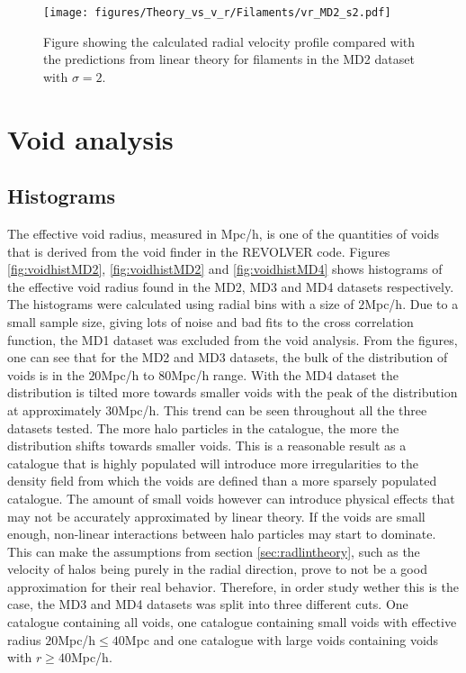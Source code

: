 \begin{figure}[H]
    \texttt{[image: figures/Theory\_vs\_v\_r/Filaments/vr\_MD2\_s2.pdf]}
    \caption{Figure showing the calculated radial velocity profile compared with the predictions from linear theory for filaments in the MD2 dataset with $\sigma=2$.}
    \label{fig:filvrMD2s2}
\end{figure}
\section{Void analysis}\label{sec:void}
\subsection{Histograms}
The effective void radius, measured in Mpc/h, is one of the quantities of voids that is derived from the void finder in the REVOLVER code. Figures \ref{fig:voidhistMD2}, \ref{fig:voidhistMD2} and \ref{fig:voidhistMD4} shows histograms of the effective void radius found in the MD2, MD3 and MD4 datasets respectively. The histograms were calculated using radial bins with a size of $2$Mpc/h. Due to a small sample size, giving lots of noise and bad fits to the cross correlation function, the MD1 dataset was excluded from the void analysis. From the figures, one can see that for the MD2 and MD3 datasets, the bulk of the distribution of voids is in the $20$Mpc/h to $80$Mpc/h range. With the MD4 dataset the distribution is tilted more towards smaller voids with the peak of the distribution at approximately $30$Mpc/h. This trend can be seen throughout all the three datasets tested. The more halo particles in the catalogue, the more the distribution shifts towards smaller voids. This is a reasonable result as a catalogue that is highly populated will introduce more irregularities to the density field from which the voids are defined than a more sparsely populated catalogue. The amount of small voids however can introduce physical effects that may not be accurately approximated by linear theory. If the voids are small enough, non-linear interactions between halo particles may start to dominate. This can make the assumptions from section \ref{sec:radlintheory}, such as the velocity of halos being purely in the radial direction, prove to not be a good approximation for their real behavior. Therefore, in order study wether this is the case, the MD3 and MD4 datasets was split into three different cuts. One catalogue containing all voids, one catalogue containing small voids with effective radius $20$Mpc/h$\leq 40$Mpc and one catalogue with large voids containing voids with $r\geq 40$Mpc/h. 

